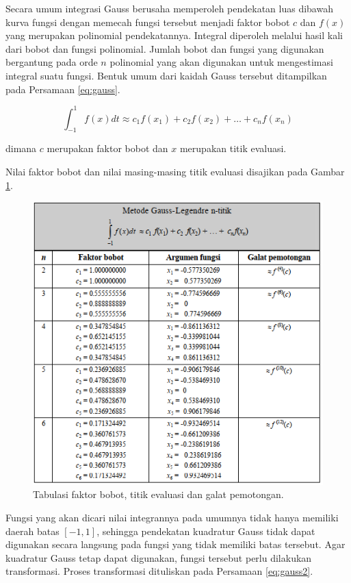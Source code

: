 \documentclass[]{book}
\theoremstyle{definition}
\theoremstyle{definition}
\theoremstyle{definition}
\theoremstyle{remark}
\begin{document}
Secara umum integrasi Gauss berusaha memperoleh pendekatan luas dibawah kurva fungsi dengan memecah fungsi tersebut menjadi faktor bobot \(c\) dan \(f\left(x\right)\) yang merupakan polinomial pendekatannya. Integral diperoleh melalui hasil kali dari bobot dan fungsi polinomial. Jumlah bobot dan fungsi yang digunakan bergantung pada orde \(n\) polinomial yang akan digunakan untuk mengestimasi integral suatu fungsi. Bentuk umum dari kaidah Gauss tersebut ditampilkan pada Persamaan \eqref{eq:gauss}.

\begin{equation}
\int_{-1}^1f\left(x\right)dt\approx c_1f\left(x_1\right)+c_2f\left(x_2\right)+\dots+c_nf\left(x_n\right)
  \label{eq:gauss}
\end{equation}

dimana \(c\) merupakan faktor bobot dan \(x\) merupakan titik evaluasi.

Nilai faktor bobot dan nilai masing-masing titik evaluasi disajikan pada Gambar \ref{fig:gaussviz}.

\begin{figure}

{\centering \includegraphics[width=0.9\linewidth]{./images/gaussviz} 

}

\caption{Tabulasi faktor bobot, titik evaluasi dan galat pemotongan.}\label{fig:gaussviz}
\end{figure}

Fungsi yang akan dicari nilai integrannya pada umumnya tidak hanya memiliki daerah batas \(\left[-1,1\right]\), sehingga pendekatan kuadratur Gauss tidak dapat digunakan secara langsung pada fungsi yang tidak memiliki batas tersebut. Agar kuadratur Gauss tetap dapat digunakan, fungsi tersebut perlu dilakukan transformasi. Proses transformasi dituliskan pada Persamaan \eqref{eq:gauss2}.
\end{document}
